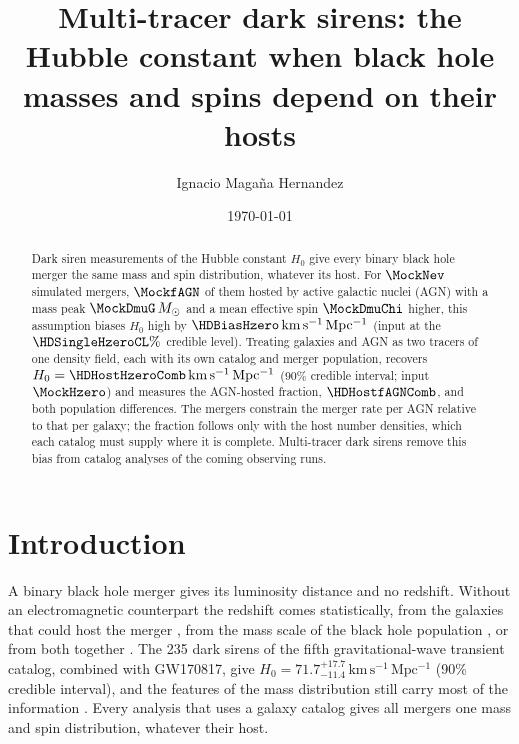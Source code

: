 \documentclass[aps,prd,reprint,superscriptaddress,nofootinbib,nolongbibliography,floatfix]{revtex4-2}
\newcommand{\kms}{\,\mathrm{km\,s^{-1}\,Mpc^{-1}}}
\newcommand{\Msun}{M_\odot}
\begin{document}
\title{Multi-tracer dark sirens: the Hubble constant when black hole masses and spins depend on their hosts}

\author{Ignacio Maga\~na Hernandez}

\date{\today}

\begin{abstract}
Dark siren measurements of the Hubble constant $H_0$ give every binary black hole merger the same mass and spin distribution, whatever its host.
For $\MockNev$ simulated mergers, $\MockfAGN$ of them hosted by active galactic nuclei (AGN) with a mass peak $\MockDmuG\,\Msun$ and a mean effective spin $\MockDmuChi$ higher, this assumption biases $H_0$ high by $\HDBiasHzero\kms$ (input at the $\HDSingleHzeroCL\%$ credible level). %
Treating galaxies and AGN as two tracers of one density field, each with its own catalog and merger population, recovers $H_0=\HDHostHzeroComb\kms$ (90\% credible interval; input $\MockHzero$) and measures the AGN-hosted fraction, $\HDHostfAGNComb$, and both population differences. %
The mergers constrain the merger rate per AGN relative to that per galaxy; the fraction follows only with the host number densities, which each catalog must supply where it is complete.
Multi-tracer dark sirens remove this bias from catalog analyses of the coming observing runs.
\end{abstract}

\maketitle

\section{Introduction}
\label{sec:intro}

A binary black hole merger gives its luminosity distance and no redshift.
Without an electromagnetic counterpart the redshift comes statistically, from the galaxies that could host the merger \cite{Schutz:1986gp,Holz:2005df,DelPozzo:2011vcw,LIGOScientific:2018gmd,DES:2019ccw,Gray:2019ksv,Gair:2022zsa}, from the mass scale of the black hole population \cite{Taylor:2011fs,Farr:2019twy,Ezquiaga:2022zkx}, or from both together \cite{Mastrogiovanni:2023emh,Gray:2023wgj,Borghi:2023opd}.
The 235 dark sirens of the fifth gravitational-wave transient catalog, combined with GW170817, give $H_0=71.7^{+17.7}_{-11.4}\kms$ (90\% credible interval), and the features of the mass distribution still carry most of the information \cite{LIGOScientific:2026uyd}.
Every analysis that uses a galaxy catalog gives all mergers one mass and spin distribution, whatever their host.
\end{document}
